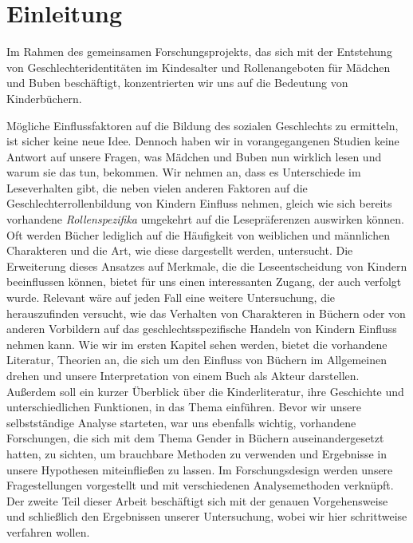 \onehalfspace

\chapter{Einleitung}

Im Rahmen des gemeinsamen Forschungsprojekts, das sich mit der
Entstehung von Geschlechteridentitäten im Kindesalter und
Rollenangeboten für Mädchen und Buben beschäftigt, konzentrierten wir
uns auf die Bedeutung von Kinderbüchern.

Mögliche Einflussfaktoren auf die Bildung des sozialen Geschlechts zu
ermitteln, ist sicher keine neue Idee. Dennoch haben wir in
vorangegangenen Studien keine Antwort auf unsere Fragen, was Mädchen und
Buben nun wirklich lesen und warum sie das tun, bekommen. Wir nehmen an,
dass es Unterschiede im Leseverhalten gibt, die neben vielen anderen
Faktoren auf die Geschlechterrollenbildung von Kindern Einfluss nehmen,
gleich wie sich bereits vorhandene \emph{Rollenspezifika} umgekehrt auf
die Lesepräferenzen auswirken können. Oft werden Bücher lediglich auf
die Häufigkeit von weiblichen und männlichen Charakteren und die Art,
wie diese dargestellt werden, untersucht. Die Erweiterung dieses
Ansatzes auf Merkmale, die die Leseentscheidung von Kindern beeinflussen
können, bietet für uns einen interessanten Zugang, der auch verfolgt
wurde. Relevant wäre auf jeden Fall eine weitere Untersuchung, die
herauszufinden versucht, wie das Verhalten von Charakteren in Büchern
oder von anderen Vorbildern auf das geschlechtsspezifische Handeln von
Kindern Einfluss nehmen kann. Wie wir im ersten Kapitel sehen werden,
bietet die vorhandene Literatur, Theorien an, die sich um den Einfluss
von Büchern im Allgemeinen drehen und unsere Interpretation von einem
Buch als Akteur darstellen. Außerdem soll ein kurzer Überblick über die
Kinderliteratur, ihre Geschichte und unterschiedlichen Funktionen, in
das Thema einführen. Bevor wir unsere selbstständige Analyse starteten,
war uns ebenfalls wichtig, vorhandene Forschungen, die sich mit dem
Thema Gender in Büchern auseinandergesetzt hatten, zu sichten, um
brauchbare Methoden zu verwenden und Ergebnisse in unsere Hypothesen
miteinfließen zu lassen. Im Forschungsdesign werden unsere
Fragestellungen vorgestellt und mit verschiedenen Analysemethoden
verknüpft. Der zweite Teil dieser Arbeit beschäftigt sich mit der
genauen Vorgehensweise und schließlich den Ergebnissen unserer
Untersuchung, wobei wir hier schrittweise verfahren wollen.
